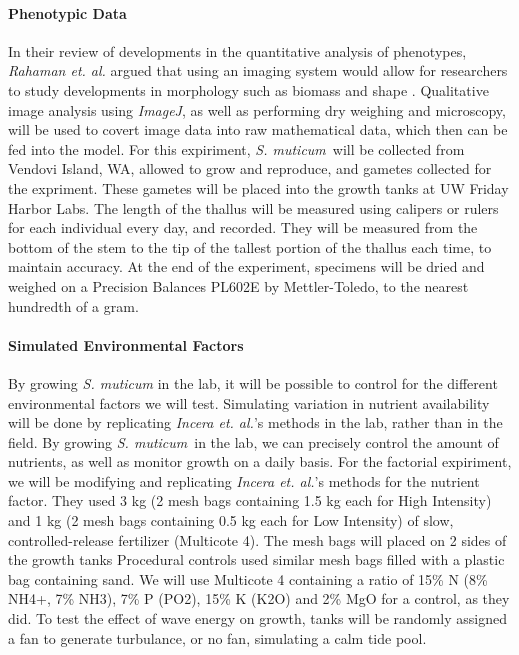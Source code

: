 \documentclass[12pt]{extarticle}
\newcommand\x{\textit{S. muticum}}
\begin{document}
\paragraph{Phenotypic Data}
In their review of developments in the quantitative analysis of phenotypes, \textit{Rahaman et. al.} argued that using an imaging system would allow for researchers to study developments in morphology such as biomass and shape \cite{10.3389/fpls.2015.00619}. Qualitative image analysis using \textit{ImageJ}, as well as performing dry weighing and microscopy, will be used to covert image data into raw mathematical data, which then can be fed into the model. For this expiriment, \x\ will be collected from Vendovi Island, WA, allowed to grow and reproduce, and gametes collected for the expriment. These gametes will be placed into the growth tanks at UW Friday Harbor Labs. The length of the thallus will be measured using calipers or rulers for each individual every day, and recorded. They will be measured from the bottom of the stem to the tip of the tallest portion of the thallus each time, to maintain accuracy. At the end of the experiment, specimens will be dried and weighed on a Precision Balances PL602E\textsuperscript{\textcopyright} by Mettler-Toledo, to the nearest hundredth of a gram.
\paragraph{Simulated Environmental Factors} By growing \textit{S. muticum} in the lab, it will be possible to control for the different environmental factors we will test. Simulating variation in nutrient availability will be done by replicating \textit{Incera et. al.}'s \cite{Incera2009} methods in the lab, rather than in the field. By growing \x\ in the lab, we can precisely control the amount of nutrients, as well as monitor growth on a daily basis. For the factorial expiriment, we will be modifying and replicating \textit{Incera et. al.}'s methods for the nutrient factor. They used 3 kg (2 mesh bags containing 1.5 kg each for High Intensity) and 1 kg
(2 mesh bags containing 0.5 kg each for Low Intensity) of slow,
controlled-release fertilizer (Multicote \textsuperscript{\textregistered} 4). The mesh bags will placed on 2 sides of the growth tanks Procedural controls used similar mesh bags filled
with a plastic bag containing sand. We will use Multicote\textsuperscript{\textregistered}
4 containing a ratio of 15\%  N (8\% NH4+, 7\% NH3), 7\%
P (PO2), 15\% K (K2O) and 2\% MgO for a control, as they did. To test the effect of wave energy on growth, tanks will be randomly assigned a fan to generate turbulance, or no fan, simulating a calm tide pool. 
\end{document}
